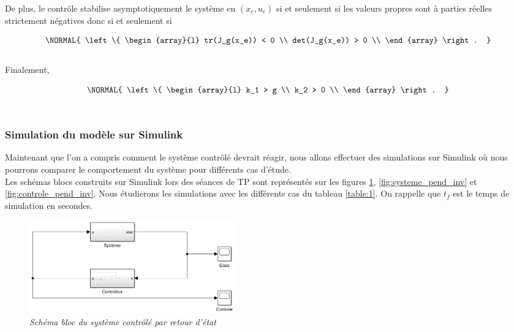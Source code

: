 \documentclass[11pt,french]{article} %
\begin{document}
\quad De plus, le contrôle stabilise asymptotiquement le système en $(x_e,u_e)$ si et seulement si les valeurs propres sont à parties réelles strictement négatives donc si et seulement si

\begin{equation}
	\NORMAL{
  \left\{
    \begin{array}{l}
			tr(J_g(x_e)) < 0 \\
			det(J_g(x_e)) > 0 \\
    \end{array}
  \right.
	}
\end{equation}\\

\quad Finalement,

\begin{equation} \label{eq:k12}
	\NORMAL{
  \left\{
    \begin{array}{l}
			k_1 > g \\
			k_2 > 0 \\
    \end{array}
  \right.
	}
\end{equation}\\

\subsubsection{Simulation du modèle sur Simulink} 

\quad Maintenant que l'on a compris comment le système contrôlé devrait réagir, nous allons effectuer des simulations sur Simulink où nous pourrons comparer le comportement du système pour différents cas d'étude. \\

\quad Les schémas blocs construits sur Simulink lors des séances de TP sont représentés sur les figures \ref{fig:simulink_controle_pend_inv}, \ref{fig:systeme_pend_inv} et \ref{fig:controle_pend_inv}. Nous étudierons les simulations avec les différents cas du tableau \ref{table:1}. On rappelle que $t_f$ est le temps de simulation en secondes. \\

\begin{figure}[H]
    \centering
    \includegraphics[width=9cm]{simulink_controle_pend_inv.png} 
		\caption{\textit{Schéma bloc du système contrôlé par retour d'état}}
		\label{fig:simulink_controle_pend_inv}
\end{figure}
\vspace{2cm}
\end{document}
